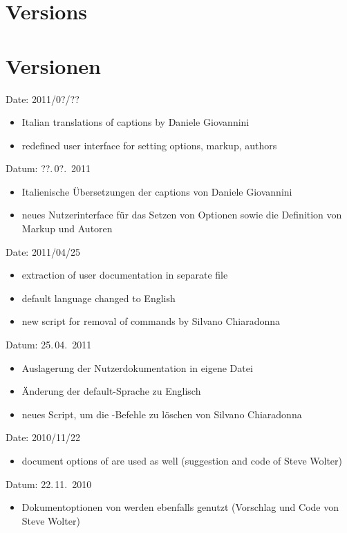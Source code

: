 \section{Versions}
\fi
\ifGERMAN
	\section{Versionen}
\fi
\label{sec:versions}


\ifENGLISH
Date: 2011/0?/??
\begin{itemize}
	\item Italian translations of captions by Daniele Giovannini
	\item redefined user interface for setting options, markup, authors
\end{itemize}
\fi
\ifGERMAN
	Datum: ??.\,0?.~2011
	\begin{itemize}
		\item Italienische Übersetzungen der captions von Daniele Giovannini
		\item neues Nutzerinterface für das Setzen von Optionen sowie die Definition von Markup und Autoren
	\end{itemize}
\fi


\ifENGLISH
Date: 2011/04/25
\begin{itemize}
	\item extraction of user documentation in separate file
	\item default language changed to English
	\item new script for removal of  commands by Silvano Chiaradonna
\end{itemize}
\fi
\ifGERMAN
	Datum: 25.\,04.~2011
	\begin{itemize}
		\item Auslagerung der Nutzerdokumentation in eigene Datei
		\item Änderung der default-Sprache zu Englisch
		\item neues Script, um die -Befehle zu löschen von Silvano Chiaradonna
	\end{itemize}
\fi


\ifENGLISH
Date: 2010/11/22
\begin{itemize}
\item document options of  are used as well (suggestion and code of Steve Wolter)
\end{itemize}
\fi
\ifGERMAN
	Datum: 22.\,11.~2010
	\begin{itemize}
	\item Dokumentoptionen von  werden ebenfalls genutzt (Vorschlag und Code von Steve Wolter)
	\end{itemize}
\fi

